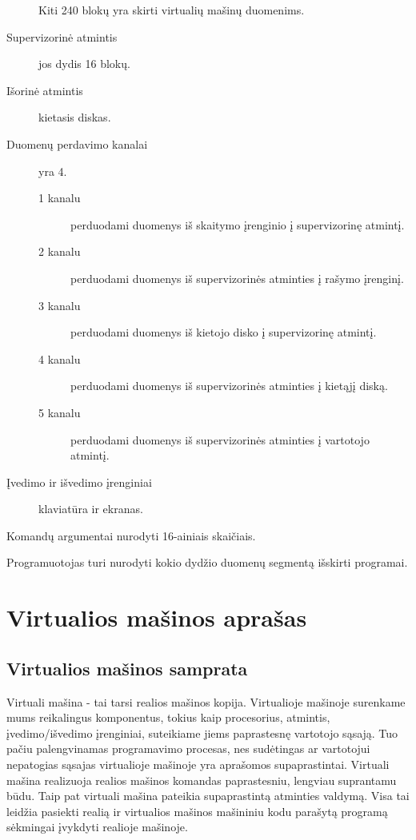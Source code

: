 \begin{description}
    Kiti 240 blokų yra skirti virtualių mašinų duomenims.
  \item[Supervizorinė atmintis] jos dydis 16 blokų.
  \item[Išorinė atmintis] kietasis diskas.
  \item[Duomenų perdavimo kanalai] yra 4. 
    \begin{description}
      \item[1 kanalu] perduodami duomenys iš skaitymo įrenginio į 
        supervizorinę atmintį.
      \item[2 kanalu] perduodami duomenys iš supervizorinės atminties
        į rašymo įrenginį.
      \item[3 kanalu] perduodami duomenys iš kietojo disko į supervizorinę
        atmintį.
      \item[4 kanalu] perduodami duomenys iš supervizorinės atminties į 
        kietąjį diską.
      \item[5 kanalu] perduodami duomenys iš supervizorinės atminties į 
        vartotojo atmintį.
    \end{description}
  \item[Įvedimo ir išvedimo įrenginiai] klaviatūra ir ekranas.
\end{description}

Komandų argumentai nurodyti 16-ainiais skaičiais.

Programuotojas turi nurodyti kokio dydžio duomenų segmentą 
išskirti programai.

\section{Virtualios mašinos aprašas}

\subsection{Virtualios mašinos samprata}

Virtuali mašina - tai tarsi realios mašinos kopija. Virtualioje mašinoje
surenkame mums reikalingus komponentus, tokius kaip procesorius,
atmintis, įvedimo/išvedimo įrenginiai, suteikiame jiems paprastesnę
vartotojo sąsają. Tuo pačiu palengvinamas programavimo procesas,
nes sudėtingas ar vartotojui nepatogias sąsajas virtualioje mašinoje yra 
aprašomos supaprastintai. Virtuali mašina realizuoja realios mašinos
komandas paprastesniu, lengviau suprantamu būdu. Taip pat virtuali mašina
pateikia supaprastintą atminties valdymą. Visa tai leidžia pasiekti realią
ir virtualios mašinos mašininiu kodu parašytą programą sėkmingai įvykdyti
realioje mašinoje. 
